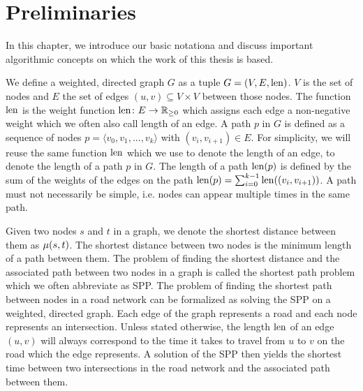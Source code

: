 
\chapter{Preliminaries\label{ch:preliminaries}}
In this chapter, we introduce our basic notationa and discuss important algorithmic concepts on which the work of this thesis is based.

We define a weighted, directed graph $G$ as a tuple $G=(V,E,\operatorname{len})$. $V$ is the set of nodes and $E$ the set of edges $(u,v) \subseteq V \times V$ between those nodes. The function $\operatorname{len}$ is the weight function $\operatorname{len}\colon E \rightarrow \mathbb{R}_{\ge 0}$ which assigns each edge a non-negative weight which we often also call length of an edge. A path $p$ in $G$ is defined as a sequence of nodes $p = \langle v_0,v_1,...,v_k \rangle$ with $(v_i,v_{i+1}) \in E$. For simplicity, we will reuse the same function $\operatorname{len}$ which we use to denote the length of an edge, to denote the length of a path $p$ in $G$. The length of a path $\operatorname{len}(p)$ is defined by the sum of the weights of the edges on the path $\operatorname{len}(p) = \sum_{i=0}^{k-1}{\operatorname{len}((v_i,v_{i+1}))}$. A path must not necessarily be simple, i.e. nodes can appear multiple times in the same path.

Given two nodes $s$ and $t$ in a graph, we denote the shortest distance between them as $\mu(s,t)$. The shortest distance between two nodes is the minimum length of a path between them. The problem of finding the shortest distance and the associated path between two nodes in a graph is called the shortest path problem which we often abbreviate as SPP. The problem of finding the shortest path between nodes in a road network can be formalized as solving the SPP on a weighted, directed graph. Each edge of the graph represents a road and each node represents an intersection. Unless stated otherwise, the length $\operatorname{len}$ of an edge $(u,v)$ will always correspond to the time it takes to travel from $u$ to $v$ on the road which the edge represents. A solution of the SPP then yields the shortest time between two intersections in the road network and the associated path between them.

